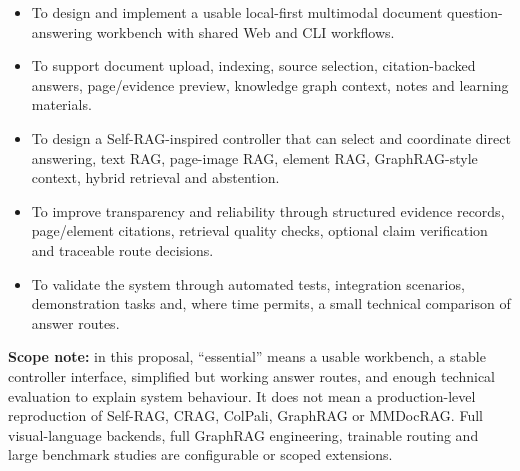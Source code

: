 \documentclass{article}
\begin{document}
\begin{itemize}
  \item To design and implement a usable local-first multimodal document question-answering workbench with shared Web and CLI workflows.
  \item To support document upload, indexing, source selection, citation-backed answers, page/evidence preview, knowledge graph context, notes and learning materials.
  \item To design a Self-RAG-inspired controller that can select and coordinate direct answering, text RAG, page-image RAG, element RAG, GraphRAG-style context, hybrid retrieval and abstention.
  \item To improve transparency and reliability through structured evidence records, page/element citations, retrieval quality checks, optional claim verification and traceable route decisions.
  \item To validate the system through automated tests, integration scenarios, demonstration tasks and, where time permits, a small technical comparison of answer routes.
\end{itemize}

\textbf{Scope note:} in this proposal, ``essential'' means a usable workbench, a stable controller interface, simplified but working answer routes, and enough technical evaluation to explain system behaviour. It does not mean a production-level reproduction of Self-RAG, CRAG, ColPali, GraphRAG or MMDocRAG. Full visual-language backends, full GraphRAG engineering, trainable routing and large benchmark studies are configurable or scoped extensions.
\end{document}
